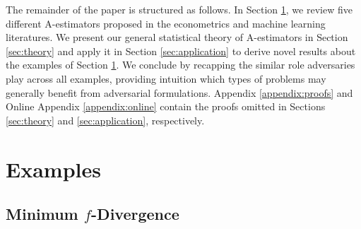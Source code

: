 \documentclass[12pt]{article}
\theoremstyle{myplain}
\theoremstyle{definition}
\theoremstyle{definition}
\theoremstyle{remark}
\numberwithin{equation}{section}
\begin{document}
The remainder of the paper is structured as follows. In Section \ref{sec:examples}, we review five different A-estimators proposed in the econometrics and machine learning literatures. We present our general statistical theory of A-estimators in Section \ref{sec:theory} and apply it in Section \ref{sec:application} to derive novel results about the examples of Section \ref{sec:examples}. We conclude by recapping the similar role adversaries play across all examples, providing intuition which types of problems may generally benefit from adversarial formulations. Appendix \ref{appendix:proofs} and Online Appendix \ref{appendix:online} contain the proofs omitted in Sections \ref{sec:theory} and \ref{sec:application}, respectively.

\section{Examples}\label{sec:examples}

\subsection{Minimum $f$-Divergence}
\label{ex:fDiv}
\end{document}
